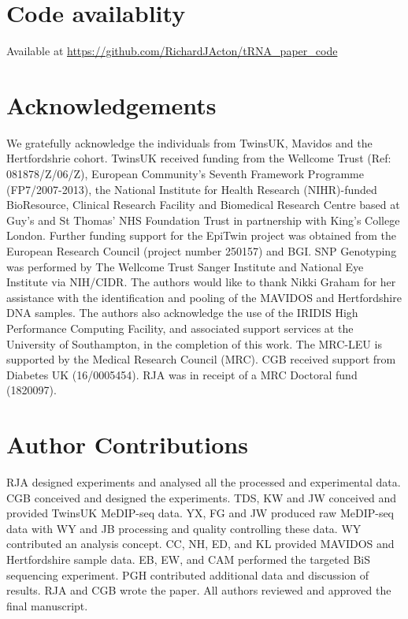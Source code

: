 \documentclass[
]{book}
\begin{document}
\hypertarget{code-availablity}{%
\section{Code availablity}\label{code-availablity}}

Available at \url{https://github.com/RichardJActon/tRNA_paper_code}

\newpage

\hypertarget{acknowledgements-1}{%
\section{Acknowledgements}\label{acknowledgements-1}}

We gratefully acknowledge the individuals from TwinsUK, Mavidos and the Hertfordshrie cohort.
TwinsUK received funding from the Wellcome Trust (Ref: 081878/Z/06/Z), European Community's Seventh Framework Programme (FP7/2007-2013), the National Institute for Health Research (NIHR)-funded BioResource, Clinical Research Facility and Biomedical Research Centre based at Guy's and St Thomas' NHS Foundation Trust in partnership with King's College London.
Further funding support for the EpiTwin project was obtained from the European Research Council (project number 250157) and BGI.
SNP Genotyping was performed by The Wellcome Trust Sanger Institute and National Eye Institute via NIH/CIDR.
The authors would like to thank Nikki Graham for her assistance with the identification and pooling of the MAVIDOS and Hertfordshire DNA samples.
The authors also acknowledge the use of the IRIDIS High Performance Computing Facility, and associated support services at the University of Southampton, in the completion of this work.
The MRC-LEU is supported by the Medical Research Council (MRC).
CGB received support from Diabetes UK (16/0005454).
RJA was in receipt of a MRC Doctoral fund (1820097).

\hypertarget{author-contributions}{%
\section{Author Contributions}\label{author-contributions}}

RJA designed experiments and analysed all the processed and experimental data.
CGB conceived and designed the experiments.
TDS, KW and JW conceived and provided TwinsUK MeDIP-seq data.
YX, FG and JW produced raw MeDIP-seq data with WY and JB processing and quality controlling these data.
WY contributed an analysis concept.
CC, NH, ED, and KL provided MAVIDOS and Hertfordshire sample data.
EB, EW, and CAM performed the targeted BiS sequencing experiment.
PGH contributed additional data and discussion of results.
RJA and CGB wrote the paper.
All authors reviewed and approved the final manuscript.
\end{document}
